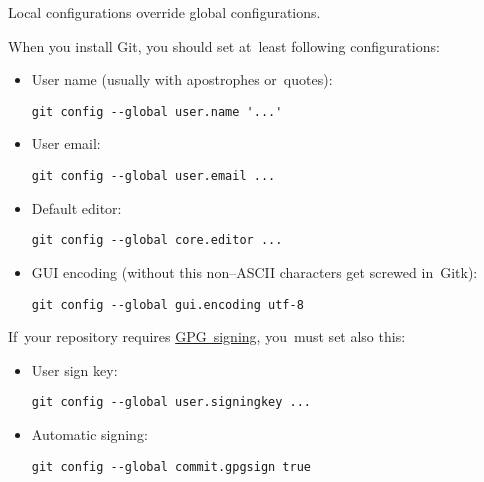 \warning Local configurations override global configurations.

\label{gitbasicconfiguration}
When you install Git, you should set at~least following configurations:
\begin{itemize}
    \item User name (usually with apostrophes or~quotes):
\begin{lstlisting}[frame=no, gobble=12]
            git config --global user.name '...'
        \end{lstlisting}
    \item User email:
\begin{lstlisting}[frame=no, gobble=12]
            git config --global user.email ...
        \end{lstlisting}
    \item Default editor:
\begin{lstlisting}[frame=no, gobble=12]
            git config --global core.editor ...
        \end{lstlisting}
    \item GUI encoding (without this non--ASCII characters get screwed in~Gitk):
\begin{lstlisting}[frame=no, gobble=12]
            git config --global gui.encoding utf-8
        \end{lstlisting}
\end{itemize}
\noindent If~your repository requires \hyperref[gitgpg]{GPG~signing}, you~must set also this:
\begin{itemize}
    \item User sign key:
\begin{lstlisting}[frame=no, gobble=12]
            git config --global user.signingkey ...
        \end{lstlisting}
    \item Automatic signing:
\begin{lstlisting}[frame=no, gobble=12]
            git config --global commit.gpgsign true
        \end{lstlisting}
\end{itemize}


\label{gitshow}



